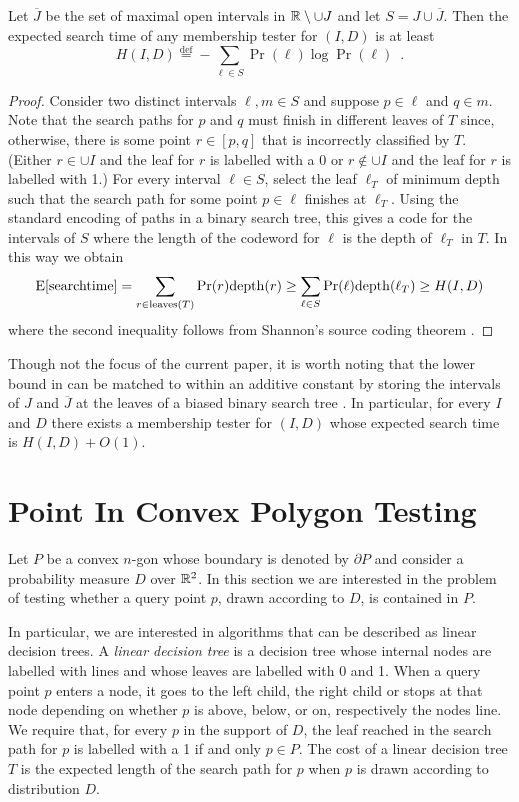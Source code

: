 \documentclass[charterfonts,lotsofwhite]{patmorin}
\newcommand{\defequals}{\stackrel{\mathrm{def}}{=}}
\begin{document}
\begin{lem}
Let $\overline{J}$ be the set of maximal open intervals in
$\mathbb{R}\setminus\cup J$ and let $S=J\cup \overline{J}$.  Then the
expected search time of any membership tester for $(I,D)$ is at least
\[
    H(I,D) \defequals 
	-\sum_{\ell\in S} \Pr(\ell)\log \Pr(\ell) \enspace .
\]
\end{lem}

\begin{proof}
Consider two distinct intervals $\ell,m\in S$ and suppose $p\in\ell$
and $q\in m$.  Note that the search paths for $p$ and $q$ must finish
in different leaves of $T$ since, otherwise, there is some point
$r\in[p,q]$ that is incorrectly classified by $T$. (Either $r\in \cup
I$ and the leaf for $r$ is labelled with a 0 or $r\not\in\cup I$ and
the leaf for $r$ is labelled with 1.)  For every interval $\ell\in S$,
select the leaf $\ell_T$ of minimum depth such that the search path
for some point $p\in\ell$ finishes at $\ell_T$.  Using the
standard encoding of paths in a binary search tree, this gives a code
for the intervals of $S$ where the length of the codeword for $\ell$
is the depth of $\ell_T$ in $T$. In this way we obtain
\[
   \mathrm{E}[\mathrm{search time}] 
    = \sum_{r\in\mathrm{leaves}(T)} \Pr(r)\mathrm{depth}(r)
   \ge \sum_{\ell\in S} \Pr(\ell)\mathrm{depth}(\ell_T)
   \ge H(I,D)
\]
where the second inequality follows from Shannon's source coding
theorem \cite{X}.
\end{proof}

Though not the focus of the current paper, it is worth noting that the
lower bound in  can be matched to within an additive
constant by storing the intervals of $J$ and $\overline{J}$ at the
leaves of a biased binary search tree \cite{kXX,mXX}.  In particular,
for every $I$ and $D$ there exists a membership tester for $(I,D)$
whose expected search time is $H(I,D)+O(1)$.

\section{Point In Convex Polygon Testing}

Let $P$ be a convex $n$-gon whose boundary is denoted by $\partial P$
and consider a probability measure $D$ over $\mathbb{R}^2$.  In this section
we are interested in the problem of testing whether a query point $p$,
drawn according to $D$, is contained in $P$.   

In particular, we are interested in algorithms that can be described
as linear decision trees.  A \emph{linear decision tree} is a decision
tree whose internal nodes are labelled with lines and whose leaves are
labelled with 0 and 1.  When a query point $p$ enters a node, it goes
to the left child, the right child or stops at that node depending on
whether $p$ is above, below, or on, respectively the nodes line.  We
require that, for every $p$ in the support of $D$, the leaf reached in
the search path for $p$ is labelled with a 1 if and only $p\in P$.
The cost of a linear decision tree $T$ is the expected length of the
search path for $p$ when $p$ is drawn according to distribution $D$.
\end{document}
